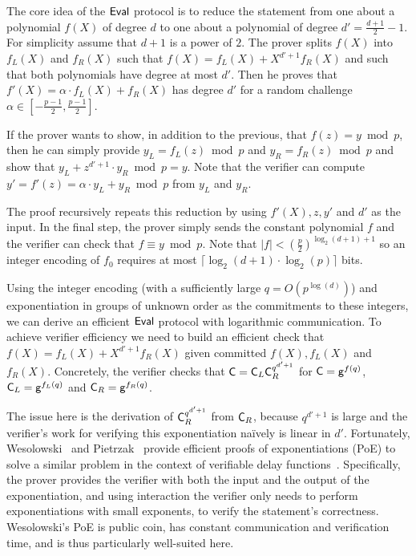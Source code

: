\documentclass{article}
\theoremstyle{definition}
\begin{document}
The core idea of the $\textsf{{Eval}}$ protocol is to reduce the statement from one about a polynomial $f(X)$ of degree $d$ to one about a polynomial of degree $d'=\frac{d+1}{2}-1$. For simplicity assume that $d+1$ is a power of $2$.
The prover splits $f(X)$ into $f_L(X)$ and $f_R(X)$ such that $f(X) = f_L(X)+X^{d'+1} f_R(X)$ and such that both polynomials have degree at most $d'$. Then he proves that $f'(X)=\alpha \cdot f_L(X) + f_R(X)$ has degree $d'$ for a random challenge $\alpha\in [-\frac{p-1}{2},\frac{p-1}{2}]$. 

If the prover wants to show, in addition to the previous, that $f(z)=y\bmod p$, then he can simply provide $y_L=f_L(z)\bmod p$ and $y_R=f_R(z)\bmod p$ and show that $y_L + z^{d'+1} \cdot y_R \bmod p=y$. Note that the verifier can compute $y' = f'(z) = \alpha \cdot y_L + y_R \bmod p$ from $y_L$ and $y_R$.

The proof recursively repeats this reduction by using $f'(X),z,y'$ and $d'$ as the input. In the final step, the prover simply sends the constant polynomial $f$ and the verifier can check that $f \equiv y \bmod p$. Note that $|f|< (\frac{p}{2})^{\log_2(d+1)+1}$ so an integer encoding of $f_0$ requires at most $\lceil \log_2(d+1) \cdot \log_2(p)\rceil$ bits.

Using the integer encoding (with a sufficiently large $q=O(p^{\log(d)})$) and exponentiation in groups of unknown order as the commitments to these integers, we can derive an efficient $\textsf{{Eval}}$ protocol with logarithmic communication. To achieve verifier efficiency we need to build an efficient check that $f(X) = f_L(X) + X^{d'+1} f_R(X)$ given committed $f(X), f_L(X)$ and $f_R(X)$. Concretely, the verifier checks that $\mathsf{C} = \mathsf{C}_L \mathsf{C}_R^{q^{d'+1}}$ for $\mathsf{C}=\mathsf{g}^{f(q)}$, $\mathsf{C}_L=\mathsf{g}^{f_L(q)}$ and $\mathsf{C}_R=\mathsf{g}^{f_R(q)}$.

The issue here is the derivation of $\mathsf{C}_R^{q^{d'+1}}$ from $\mathsf{C}_R$, because $q^{d'+1}$ is large and the verifier's work for verifying this exponentiation naïvely is linear in $d'$.
Fortunately, Wesolowski~\cite{EC:Wesolowski19} and Pietrzak~\cite{EPRINT:Pietrzak18b} provide efficient proofs of exponentiations (\textsf{PoE}) to solve a similar problem in the context of verifiable delay functions~\cite{C:BBBF18}. Specifically, the prover provides the verifier with both the input and the output of the exponentiation, and using interaction the verifier only needs to perform exponentiations with small exponents, to verify the statement's correctness. Wesolowski's \textsf{PoE} is public coin, has constant communication and verification time, and is thus particularly well-suited here.
\end{document}

